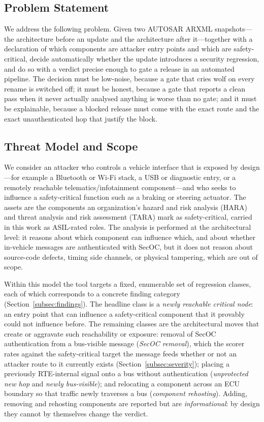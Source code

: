 \documentclass[journal]{IEEEtran}
\begin{document}
\subsection{Problem Statement}
\label{subsec:problem}

We address the following problem. Given two AUTOSAR ARXML snapshots---the
architecture before an update and the architecture after it---together with a
declaration of which components are attacker entry points and which are
safety-critical, decide automatically whether the update introduces a security
regression, and do so with a verdict precise enough to gate a release in an
automated pipeline. The decision must be low-noise, because a gate that cries
wolf on every rename is switched off; it must be honest, because a gate that
reports a clean pass when it never actually analysed anything is worse than no
gate; and it must be explainable, because a blocked release must come with the
exact route and the exact unauthenticated hop that justify the block.

\subsection{Threat Model and Scope}
\label{subsec:scope}

We consider an attacker who controls a vehicle interface that is exposed by
design---for example a Bluetooth or Wi-Fi stack, a USB or diagnostic entry, or
a remotely reachable telematics/infotainment component---and who seeks to
influence a safety-critical function such as a braking or steering actuator.
The assets are the components an organization's hazard and risk analysis
(HARA) and threat analysis and risk assessment (TARA) mark as safety-critical,
carried in this work as ASIL-rated roles. The analysis is performed at the
architectural level: it reasons about which component can influence which, and
about whether in-vehicle messages are authenticated with SecOC, but it does not
reason about source-code defects, timing side channels, or physical tampering,
which are out of scope.

Within this model the tool targets a fixed, enumerable set of regression
classes, each of which corresponds to a concrete finding category
(Section~\ref{subsec:findings}). The headline class is a \emph{newly reachable
critical node}: an entry point that can influence a safety-critical component
that it provably could not influence before. The remaining classes are the
architectural moves that create or aggravate such reachability or exposure:
removal of SecOC authentication from a bus-visible message (\emph{SecOC
removal}), which the scorer rates against the safety-critical target the
message feeds whether or not an attacker route to it currently exists
(Section~\ref{subsec:severity}); placing a previously RTE-internal signal onto a
bus without authentication (\emph{unprotected new hop} and \emph{newly
bus-visible}); and relocating a component across an ECU boundary so that
traffic newly traverses a bus (\emph{component rehosting}). Adding, removing and
rehosting components are reported but are \emph{informational}: by design they
cannot by themselves change the verdict.
\end{document}
